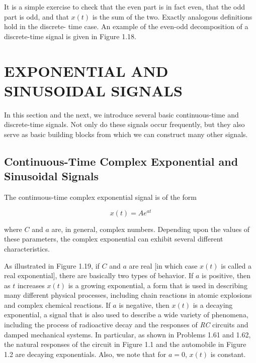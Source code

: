\documentclass{report}
\begin{document}
It is a simple exercise to check that the even part is in fact even, that the odd part is odd, and that \(x(t)\) is the sum of the two. Exactly analogous
definitions hold in the discrete- time case. An example of the even-odd decomposition of a discrete-time signal is given in Figure 1.18.

\section*{EXPONENTIAL AND SINUSOIDAL SIGNALS}

In this section and the next, we introduce several basic continuous-time and discrete-time signals. Not only do these signals occur frequently, but
they also serve as basic building blocks from which we can construct many other signals.

\subsection*{Continuous-Time Complex Exponential and Sinusoidal Signals}

The continuous-time complex exponential signal is of the form

\begin{equation}
x(t)=A e^{a t}
\end{equation}

where \(C\) and \(a\) are, in general, complex numbers. Depending upon the values of these parameters, the complex exponential can exhibit several
different characteristics.


As illustrated in Figure 1.19, if \(C\) and \(a\) are real [in which case \(x(t)\) is called a real exponential], there are basically two types of
behavior. If \(a\) is positive, then as \(t\) increases \(x(t)\) is a growing exponential, a form that is used in describing many different physical
processes, including chain reactions in atomic explosions and complex chemical reactions. If \(a\) is negative, then \(x(t)\) is a decaying exponential,
a signal that is also used to describe a wide variety of phenomena, including the process of radioactive decay and the responses of \textit{ RC}
circuits and damped mechanical systems. In particular, as shown in Problems 1.61 and 1.62, the natural responses of the circuit in Figure 1.1 and
the automobile in Figure 1.2 are decaying exponentials. Also, we note that for \(a = 0\), \(x(t)\) is constant.
\end{document}
